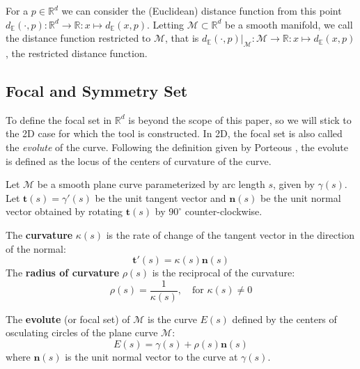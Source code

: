 \documentclass[a4paper,english,numberwithinsect]{eurocg26}
\newcommand{\M}{\mathcal{M}}
\begin{document}
\begin{definition}
For a $p \in \mathbb{R}^d$ we can consider the (Euclidean) distance function from this point $d_\mathbb{E} (\cdot,p): \mathbb{R}^d \to \mathbb{R}: x \mapsto d_\mathbb{E} (x, p)$. Letting $\M \subset \mathbb{R}^d$ be a smooth manifold, we call the distance function restricted to $\M$, that is $d_\mathbb{E}  (\cdot ,p) |_\M  : \M \to \mathbb{R}: x \mapsto d_\mathbb{E} (x, p)$, the restricted distance function.   
\end{definition} 

\subsection{Focal and Symmetry Set}

To define the focal set in $\mathbb{R}^d$ is beyond the scope of this paper, so we will stick to the 2D case for which the tool is constructed. In 2D, the focal set is also called the \textit{evolute} of the curve. Following the definition given by Porteous \cite{porteous2001geometric}, the evolute is defined as the locus of the centers of curvature of the curve.

Let $\mathcal{M}$ be a smooth plane curve parameterized by arc length $s$, given by $\gamma(s)$. Let $\mathbf{t}(s) = \gamma'(s)$ be the unit tangent vector and $\mathbf{n}(s)$ be the unit normal vector obtained by rotating $\mathbf{t}(s)$ by $90^\circ$ counter-clockwise.

\begin{definition}
The \textbf{curvature} $\kappa(s)$ is the rate of change of the tangent vector in the direction of the normal:
\begin{equation*}
    \mathbf{t}'(s) = \kappa(s) \mathbf{n}(s)
\end{equation*}
The \textbf{radius of curvature} $\rho(s)$ is the reciprocal of the curvature:
\begin{equation*}
    \rho(s) = \frac{1}{\kappa(s)}, \quad \text{for } \kappa(s) \neq 0
\end{equation*}
\end{definition}

\begin{definition}[Evolute]
The \textbf{evolute} (or focal set) of $\mathcal{M}$ is the curve $E(s)$ defined by the centers of osculating circles {of the plane curve} $\mathcal{M}$:
\begin{equation*}
    E(s) = \gamma(s) + \rho(s) \mathbf{n}(s)
\end{equation*}
where $\mathbf{n}(s)$ is the unit normal vector to the curve at $\gamma(s)$.
\end{definition}
\end{document}
